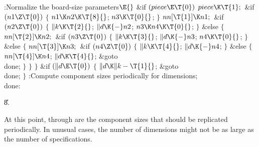\B{}:Normalize the board-size parameters\X${}\E{}$\6
\&{if} ${}(\\{piece}\E\T{0}){}$\1\5
${}\\{piece}\K\T{1};{}$\2\6
\&{if} ${}(\\{n1}\Z\T{0}){}$\5
${}\{{}$\5
\1${}\\{n1}\K\\{n2}\K\T{8}{}$;\5
${}\\{n3}\K\T{0}{}$;\5
${}\}{}$\2\6
${}\\{nn}[\T{1}]\K\\{n1};{}$\6
\&{if} ${}(\\{n2}\Z\T{0}){}$\5
${}\{{}$\5
\1${}\|k\K\T{2}{}$;\5
${}\|d\K{-}\\{n2}{}$;\5
${}\\{n3}\K\\{n4}\K\T{0}{}$;\5
${}\}{}$\2\6
\&{else}\5
${}\{{}$\1\6
${}\\{nn}[\T{2}]\K\\{n2};{}$\6
\&{if} ${}(\\{n3}\Z\T{0}){}$\5
${}\{{}$\5
\1${}\|k\K\T{3}{}$;\5
${}\|d\K{-}\\{n3}{}$;\5
${}\\{n4}\K\T{0}{}$;\5
${}\}{}$\2\6
\&{else}\5
${}\{{}$\1\6
${}\\{nn}[\T{3}]\K\\{n3};{}$\6
\&{if} ${}(\\{n4}\Z\T{0}){}$\5
${}\{{}$\5
\1${}\|k\K\T{4}{}$;\5
${}\|d\K{-}\\{n4}{}$;\5
${}\}{}$\2\6
\&{else}\5
${}\{{}$\5
\1${}\\{nn}[\T{4}]\K\\{n4}{}$;\5
${}\|d\K\T{4}{}$;\5
\&{goto} \\{done};\5
${}\}{}$\2\6
\4${}\}{}$\2\6
\4${}\}{}$\2\6
\&{if} ${}(\|d\E\T{0}){}$\5
${}\{{}$\5
\1${}\|d\K\|k-\T{1}{}$;\5
\&{goto} \\{done};\5
${}\}{}$\2\6
:Compute component sizes periodically for  dimensions\X;\6
\\{done}:\par
\U8.\fi

At this point,  through  are
the component sizes
that should be replicated periodically. In unusual cases, the number
of dimensions might not be as large as the number of specifications.

